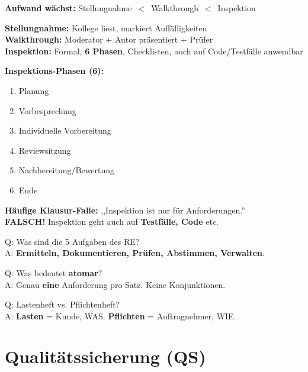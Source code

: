 \documentclass[11pt,a4paper]{article}
\begin{document}
\begin{keyfacts}
\textbf{Aufwand wächst:} Stellungnahme \,$<$\, Walkthrough \,$<$\, Inspektion

\textbf{Stellungnahme:} Kollege liest, markiert Auffälligkeiten\\
\textbf{Walkthrough:} Moderator + Autor präsentiert + Prüfer\\
\textbf{Inspektion:} Formal, \textbf{6 Phasen}, Checklisten, auch auf Code/Testfälle anwendbar
\end{keyfacts}

\begin{merkhilfe}
\textbf{Inspektions-Phasen (6):}
\begin{enumerate}
  \item Planung
  \item Vorbesprechung
  \item Individuelle Vorbereitung
  \item Reviewsitzung
  \item Nachbereitung/Bewertung
  \item Ende
\end{enumerate}
\end{merkhilfe}

\begin{trap}
\textbf{Häufige Klausur-Falle:} ,,Inspektion ist nur für Anforderungen.''\\
\textbf{FALSCH!} Inspektion geht auch auf \textbf{Testfälle, Code} etc.
\end{trap}

\begin{quickcheck}
Q: Was sind die 5 Aufgaben des RE?\\
A: \textbf{Ermitteln, Dokumentieren, Prüfen, Abstimmen, Verwalten}.

Q: Was bedeutet \textbf{atomar}?\\
A: Genau \textbf{eine} Anforderung pro Satz. Keine Konjunktionen.

Q: Lastenheft vs. Pflichtenheft?\\
A: \textbf{Lasten} = Kunde, WAS. \textbf{Pflichten} = Auftragnehmer, WIE.
\end{quickcheck}

\newpage
\section{Qualitätssicherung (QS)}
\end{document}
